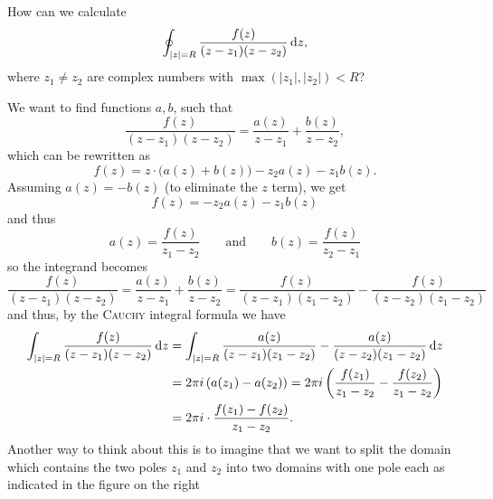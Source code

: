 \documentclass[a4paper,english]{article}
\begin{document}
\begin{exampleB}
    How can we calculate
    \begin{equation*}
        \oint_{| z | = R} \frac{f(z)}{(z - z_1) (z - z_2)} \mathop{}\!\mathrm{d}{z},
    \end{equation*}
    where $z_1 \ne z_2$ are complex numbers with $\max(| z_1 |, | z_2 |) < R$?
    
    We want to find functions $a, b$, such that
    \begin{equation*}
        \frac{f(z)}{(z - z_1) (z - z_2)}
        = \frac{a(z)}{z - z_1} + \frac{b(z)}{z - z_2},
    \end{equation*}
    which can be rewritten as
    \begin{equation*}
        f(z)
        = z \cdot \big( a(z) + b(z) \big) - z_2 a(z) - z_1 b(z).
    \end{equation*}
    Assuming $a(z) = - b(z)$ (to eliminate the $z$ term), we get
    \begin{equation*}
        f(z)
        = - z_2 a(z) - z_1 b(z)
    \end{equation*}
    and thus
    \begin{equation*}
        a(z)
        = \frac{f(z)}{z_1 - z_2}
        \qquad \text{and} \qquad
        b(z)
        = \frac{f(z)}{z_2 - z_1}
    \end{equation*}
    so the integrand becomes
    \begin{equation*}
        \frac{f(z)}{(z - z_1) (z - z_2)}
        = \frac{a(z)}{z - z_1} + \frac{b(z)}{z - z_2} 
        = \frac{f(z)}{(z - z_1)(z_1 - z_2)} - \frac{f(z)}{(z - z_2)(z_1 - z_2)}
    \end{equation*}
    and thus, by the \textsc{Cauchy} integral formula we have
    \begin{align*}
        \int_{| z | = R} \frac{f(z)}{(z - z_1) (z - z_2)} \mathop{}\!\mathrm{d}{z}
        & = \int_{| z | = R}\frac{a(z)}{(z - z_1)(z_1 - z_2)} - \frac{a(z)}{(z - z_2)(z_1 - z_2)} \mathop{}\!\mathrm{d}{z} \\
        & = 2 \pi i \left( a(z_1) - a(z_2) \right)
        = 2 \pi i \left( \frac{f(z_1)}{z_1 - z_2} - \frac{f(z_2)}{z_1 - z_2}\right) \\
        & = 2 \pi i \cdot \frac{f(z_1) - f(z_2)}{z_1 - z_2}.
    \end{align*}
    Another way to think about this is to imagine that we want to split the domain which contains the two poles $z_1$ and $z_2$ into two domains with one pole each as indicated in the figure on the right
    \begin{marginfigure}

\end{marginfigure}
\end{exampleB}
\end{document}
